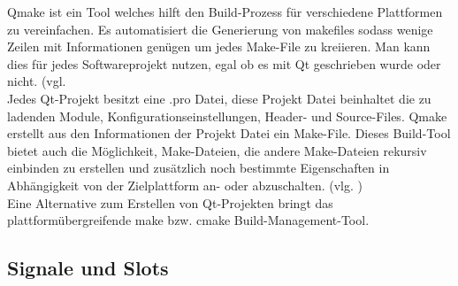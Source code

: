 Qmake ist ein Tool welches hilft den Build-Prozess für verschiedene Plattformen zu vereinfachen. Es automatisiert die Generierung von makefiles sodass wenige Zeilen mit Informationen genügen um jedes Make-File zu kreiieren. Man kann dies für jedes Softwareprojekt nutzen, egal ob es mit Qt geschrieben wurde oder nicht. (vgl.\cite{QtQmake} \\
Jedes Qt-Projekt besitzt eine .pro Datei, diese Projekt Datei beinhaltet die zu ladenden Module, Konfigurationseinstellungen, Header- und Source-Files. Qmake erstellt aus den Informationen der Projekt Datei ein Make-File. 
Dieses Build-Tool bietet auch die Möglichkeit, Make-Dateien, die andere Make-Dateien rekursiv einbinden zu erstellen und zusätzlich noch bestimmte Eigenschaften in Abhängigkeit von der Zielplattform an- oder abzuschalten. (vlg. \cite{BS2009, S.219}) \\
Eine Alternative zum Erstellen von Qt-Projekten bringt das plattformübergreifende make bzw. cmake Build-Management-Tool.	
	
\subsection{Signale und Slots}

